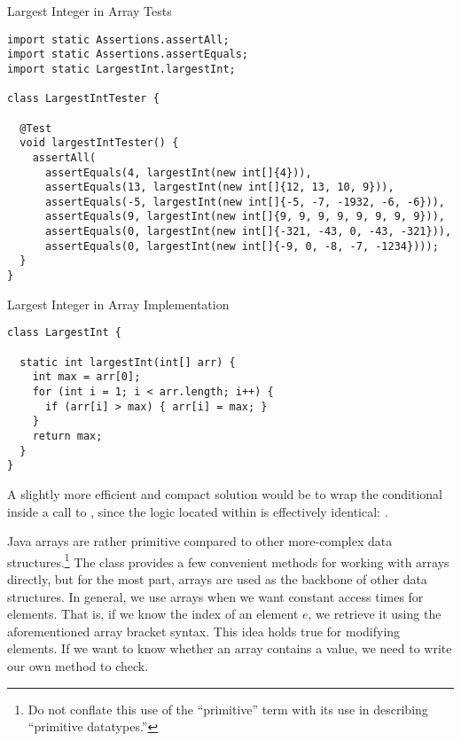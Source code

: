 \begin{cl}[]{Largest Integer in Array Tests}
\begin{lstlisting}[language=MyJava]
import static Assertions.assertAll;
import static Assertions.assertEquals;
import static LargestInt.largestInt;

class LargestIntTester {

  @Test
  void largestIntTester() {
    assertAll(
      assertEquals(4, largestInt(new int[]{4})), 
      assertEquals(13, largestInt(new int[]{12, 13, 10, 9})), 
      assertEquals(-5, largestInt(new int[]{-5, -7, -1932, -6, -6})), 
      assertEquals(9, largestInt(new int[]{9, 9, 9, 9, 9, 9, 9, 9})), 
      assertEquals(0, largestInt(new int[]{-321, -43, 0, -43, -321})), 
      assertEquals(0, largestInt(new int[]{-9, 0, -8, -7, -1234})));
  }
}
\end{lstlisting}
\end{cl}

\begin{cl}[]{Largest Integer in Array Implementation}
\begin{lstlisting}[language=MyJava]
class LargestInt {

  static int largestInt(int[] arr) {
    int max = arr[0];
    for (int i = 1; i < arr.length; i++) {
      if (arr[i] > max) { arr[i] = max; }
    }
    return max;
  }
}
\end{lstlisting}
\end{cl}

A slightly more efficient and compact solution would be to wrap the conditional inside a call to , since the logic located within is effectively identical: .

Java arrays are rather primitive compared to other more-complex data structures.\footnote{Do not conflate this use of the ``primitive'' term with its use in describing ``primitive datatypes.''} The  class provides a few convenient methods for working with arrays directly, but for the most part, arrays are used as the backbone of other data structures. In general, we use arrays when we want constant access times for elements. That is, if we know the index of an element $e$, we retrieve it using the aforementioned array bracket syntax. This idea holds true for modifying elements. If we want to know whether an array contains a value, we need to write our own method to check. 

